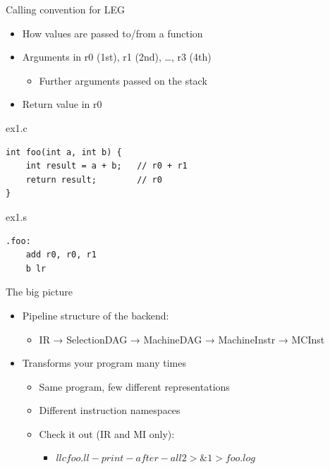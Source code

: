 
\begin{frame}[fragile]{Calling convention for LEG}

\begin{itemize}
    \item How values are passed to/from a function
    \item Arguments in r0 (1st), r1 (2nd), …, r3 (4th)
    \begin{itemize}
        \item Further arguments passed on the stack
    \end{itemize}
    \item Return value in r0
\end{itemize}

\begin{block}{ex1.c}
\begin{lstlisting}
int foo(int a, int b) {
    int result = a + b;   // r0 + r1
    return result;        // r0
}
\end{lstlisting}
\end{block}

\begin{block}{ex1.s}
\begin{lstlisting}
.foo:
    add r0, r0, r1
    b lr
\end{lstlisting}
\end{block}

\end{frame}


\begin{frame}{The big picture}

\begin{itemize}
    \item Pipeline structure of the backend:
    \begin{itemize}
        \item IR → SelectionDAG → MachineDAG  → MachineInstr → MCInst
    \end{itemize}
    \item Transforms your program many times
    \begin{itemize}
        \item Same program, few different representations
        \item Different instruction namespaces
        \item Check it out (IR and MI only):
        \begin{itemize}
            \item $llc foo.ll -print-after-all 2>\&1 > foo.log$
        \end{itemize}
    \end{itemize}
\end{itemize}

\end{frame}

